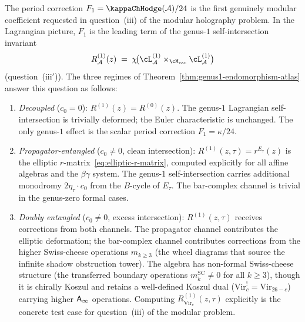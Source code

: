 \begin{remark}%
\label{rem:modular-problem-genus1}%
%
%
The period correction $F_1 = \kappaChHodge(\cA)/24$ is the
first genuinely modular coefficient requested in
question~(iii) of the modular holography problem.
In the Lagrangian picture, $F_1$ is the leading term
of the genus-$1$ self-intersection invariant
\[
R^{(1)}_\cA(z)
\;=\;
\chi\!\bigl(
 \cL_\cA^{(1)} \times_{\Mvac} \cL_\cA^{(1)}
\bigr)
\]
(question~(iii$'$)). The three regimes of
Theorem~\ref{thm:genus1-endomorphism-atlas}
answer this question as follows:
\begin{enumerate}[label=\textup{(\alph*)},nosep]
\item \emph{Decoupled} ($c_0 = 0$):
 $R^{(1)}(z) = R^{(0)}(z)$. The genus-$1$
 Lagrangian self-intersection is trivially deformed;
 the Euler characteristic is unchanged. The only
 genus-$1$ effect is the scalar period correction
 $F_1 = \kappa/24$.

\item \emph{Propagator-entangled} ($c_0 \ne 0$, clean
 intersection):
 $R^{(1)}(z,\tau) = r^{E_\tau}(z)$ is the elliptic
 $r$-matrix~\eqref{eq:elliptic-r-matrix}, computed
 explicitly for all affine algebras and the
 $\beta\gamma$ system. The genus-$1$
 self-intersection carries additional monodromy
 $2\eta_\tau \cdot c_0$ from the $B$-cycle of
 $E_\tau$. The bar-complex channel is trivial in the
 genus-zero formal cases.

\item \emph{Doubly entangled} ($c_0 \ne 0$, excess
 intersection):
 $R^{(1)}(z,\tau)$ receives corrections from both
 channels. The propagator channel contributes the
 elliptic deformation; the bar-complex channel
 contributes corrections from the higher Swiss-cheese
 operations $m_{k \ge 3}$ (the wheel diagrams that
 source the infinite shadow obstruction tower). The algebra
 has non-formal Swiss-cheese structure (the transferred
 boundary operations $m_k^{\mathrm{SC}} \ne 0$ for all
 $k \ge 3$), though it is chirally Koszul and retains a
 well-defined Koszul dual ($\mathrm{Vir}_c^! = \mathrm{Vir}_{26-c}$)
 carrying higher $\mathsf{A}_{\infty}$ operations. Computing
 $R^{(1)}_{\mathrm{Vir}_c}(z,\tau)$ explicitly is
 the concrete test case for question~(iii) of the
 modular problem.
\end{enumerate}
\end{remark}

